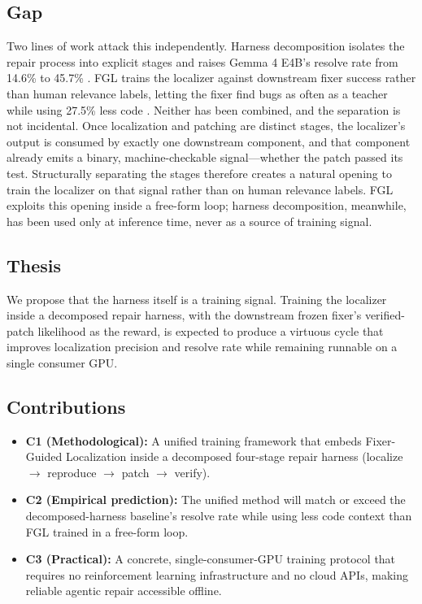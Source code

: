 \documentclass[11pt,a4paper]{article}
\begin{document}
\subsection{Gap}
Two lines of work attack this independently. Harness decomposition isolates the repair process into explicit stages and raises Gemma 4 E4B's resolve rate from 14.6\% to 45.7\% \cite{LOOP}. FGL trains the localizer against downstream fixer success rather than human relevance labels, letting the fixer find bugs as often as a teacher while using 27.5\% less code \cite{FGL}. Neither has been combined, and the separation is not incidental. Once localization and patching are distinct stages, the localizer's output is consumed by exactly one downstream component, and that component already emits a binary, machine-checkable signal---whether the patch passed its test. Structurally separating the stages therefore creates a natural opening to train the localizer on that signal rather than on human relevance labels. FGL exploits this opening inside a free-form loop; harness decomposition, meanwhile, has been used only at inference time, never as a source of training signal.

\subsection{Thesis}
We propose that the harness itself is a training signal. Training the localizer inside a decomposed repair harness, with the downstream frozen fixer's verified-patch likelihood as the reward, is expected to produce a virtuous cycle that improves localization precision and resolve rate while remaining runnable on a single consumer GPU.

\subsection{Contributions}
\begin{itemize}[leftmargin=*, nosep, topsep=4pt]
    \item \textbf{C1 (Methodological):} A unified training framework that embeds Fixer-Guided Localization inside a decomposed four-stage repair harness (localize $\rightarrow$ reproduce $\rightarrow$ patch $\rightarrow$ verify).
    \item \textbf{C2 (Empirical prediction):} The unified method will match or exceed the decomposed-harness baseline's resolve rate while using less code context than FGL trained in a free-form loop.
    \item \textbf{C3 (Practical):} A concrete, single-consumer-GPU training protocol that requires no reinforcement learning infrastructure and no cloud APIs, making reliable agentic repair accessible offline.
\end{itemize}
\end{document}
